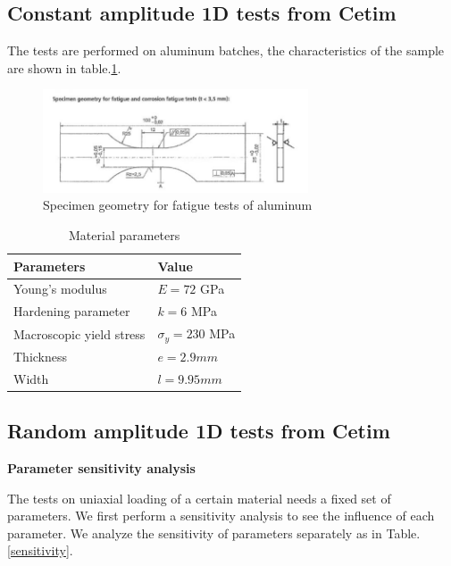 \documentclass[3p,times,number,review]{elsarticle}
\begin{document}
\subsection{Constant amplitude 1D tests from Cetim}

The tests are performed on aluminum batches, the characteristics of the sample are shown in table.\ref{tab:cetim}.
\begin{figure}[!h]
	\centering
	\includegraphics[width=0.7\textwidth]{figures//aluminum_cetim.png} 
	\caption{Specimen geometry for fatigue tests of aluminum}
	\label{fig:aluminum}
\end{figure}
\begin{table}[!h]
	\centering
	\begin{tabular}{ll}
		\hline
		\textbf{Parameters}                                         & \textbf{Value}                    \\ \hline
		Young's modulus                                             & $E=72$ GPa                       \\
		Hardening parameter                                         &  $k=6$ MPa \\
		Macroscopic yield stress                                    & $\sigma_y=230$ MPa              \\
		Thickness & $e=2.9mm$                        \\
		Width		 & $l= 9.95mm$                        \\ \hline
	\end{tabular}
	\caption{Material parameters}
	\label{tab:cetim}
\end{table}



\newpage
\subsection{Random amplitude 1D tests from Cetim}

\textbf{Parameter sensitivity analysis}

The tests on uniaxial loading of a certain material needs a fixed set of parameters. We first perform a sensitivity analysis to see the influence of each parameter. We analyze the sensitivity of parameters separately as in Table.\ref{sensitivity}. 
\end{document}
